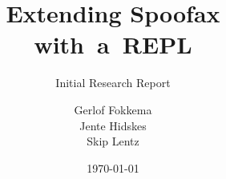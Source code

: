 \title[tudelft-black]{Extending Spoofax\\ with~a~REPL}
\subtitle[tudelft-black]{Initial Research Report}
\author[tudelft-black]{%
Gerlof Fokkema\\
Jente Hidskes\\
Skip Lentz}
\date{\today}

